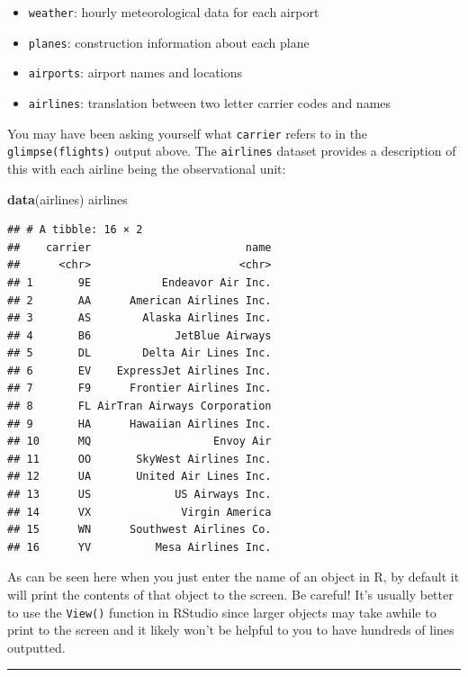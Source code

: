 \documentclass[]{tufte-book}
\newenvironment{Shaded}{\begin{snugshade}}{\end{snugshade}}
\newcommand{\KeywordTok}[1]{\textcolor[rgb]{0.13,0.29,0.53}{\textbf{{#1}}}}
\newcommand{\NormalTok}[1]{{#1}}
\let\oldrule=\rule
\renewcommand{\rule}[1]{\oldrule{\linewidth}}
\providecommand{\tightlist}{%
  \setlength{\itemsep}{0pt}\setlength{\parskip}{0pt}}
\begin{document}
\begin{itemize}
\tightlist
\item
  \texttt{weather}: hourly meteorological data for each airport
\item
  \texttt{planes}: construction information about each plane
\item
  \texttt{airports}: airport names and locations
\item
  \texttt{airlines}: translation between two letter carrier codes and
  names
\end{itemize}

You may have been asking yourself what \texttt{carrier} refers to in the
\texttt{glimpse(flights)} output above. The \texttt{airlines} dataset
provides a description of this with each airline being the observational
unit:

\begin{Shaded}
\begin{Highlighting}[]
\KeywordTok{data}\NormalTok{(airlines)}
\NormalTok{airlines}
\end{Highlighting}
\end{Shaded}

\begin{verbatim}
## # A tibble: 16 × 2
##    carrier                        name
##      <chr>                       <chr>
## 1       9E           Endeavor Air Inc.
## 2       AA      American Airlines Inc.
## 3       AS        Alaska Airlines Inc.
## 4       B6             JetBlue Airways
## 5       DL        Delta Air Lines Inc.
## 6       EV    ExpressJet Airlines Inc.
## 7       F9      Frontier Airlines Inc.
## 8       FL AirTran Airways Corporation
## 9       HA      Hawaiian Airlines Inc.
## 10      MQ                   Envoy Air
## 11      OO       SkyWest Airlines Inc.
## 12      UA       United Air Lines Inc.
## 13      US             US Airways Inc.
## 14      VX              Virgin America
## 15      WN      Southwest Airlines Co.
## 16      YV          Mesa Airlines Inc.
\end{verbatim}

As can be seen here when you just enter the name of an object in R, by
default it will print the contents of that object to the screen. Be
careful! It's usually better to use the \texttt{View()} function in
RStudio since larger objects may take awhile to print to the screen and
it likely won't be helpful to you to have hundreds of lines outputted.

\begin{center}\rule{0.5\linewidth}{\linethickness}\end{center}
\end{document}
